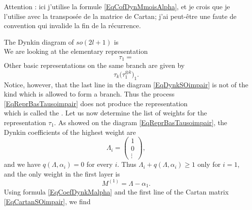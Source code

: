 \begin{probleme}
Attention : ici j'utilise la formule \eqref{EqCofDynMmoisAlpha}, et je crois que je l'utilise avec la transposée de la matrice de Cartan; j'ai peut-être une faute de convention qui invalide la fin de la récurrence.
\end{probleme}

The Dynkin diagram of $so(2l+1)$ is
\begin{equation}		\label{EqDynkSOimpair}
   
\end{equation}
We are looking at the elementary representation
\begin{equation}
    \tau_1=
\end{equation}
Other basic representations on the same branch are given by
\begin{equation}		\label{EqReprBasTausoimpair}
	\tau_k\big( \tau_1^{\otimes k} \big)_1.
\end{equation}
Notice, however, that the last line in the diagram \eqref{EqDynkSOimpair} is not of the kind which is allowed to form a branch. Thus the process \eqref{EqReprBasTausoimpair} does not produce the representation
\begin{equation}
   
\end{equation}
which is called the . Let us now determine the list of weights for the representation $\tau_1$. As showed on the diagram \eqref{EqReprBasTausoimpair}, the Dynkin coefficients of the highest weight are
\begin{equation}
	\Lambda_i=
	\begin{pmatrix}
		1\\
		0\\
		\vdots
	\end{pmatrix},
\end{equation}
and we have $q(\Lambda,\alpha_i)=0$ for every $i$. Thus $\Lambda_i+q(\Lambda,\alpha_i)\geq 1$ only for $i=1$, and the only weight in the first layer is
\begin{equation}
	M^{(1)}=\Lambda-\alpha_1.
\end{equation}
Using formula \eqref{EqCoefDynkMalpha} and the first line of the Cartan matrix \eqref{EqCartanSOimpair}, we find
